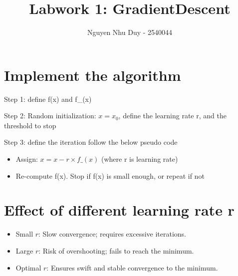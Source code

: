 \documentclass{article}
\title{Labwork 1: GradientDescent}
\author{Nguyen Nhu Duy - 2540044}
\begin{document}
\setlength{\parindent}{0pt}
\maketitle
\section{Implement the algorithm}
Step 1: define f(x) and f\_(x)

Step 2: Random initialization: $x = x_0$, define the learning rate r, and the threshold to stop 

Step 3: define the iteration follow the below pseudo code

\begin{itemize}
    \item  Assign:  $x = x - r \times f\_(x)$ (where r is learning rate)
    \item  Re-compute f(x). Stop if f(x) is small enough, or repeat if not
\end{itemize}

\section{Effect of different learning rate r}
\begin{itemize}
    \item Small $r$: Slow convergence; requires excessive iterations.
    \item Large $r$: Risk of overshooting; fails to reach the minimum.
    \item Optimal $r$: Ensures swift and stable convergence to the minimum.
\end{itemize}
\end{document}
